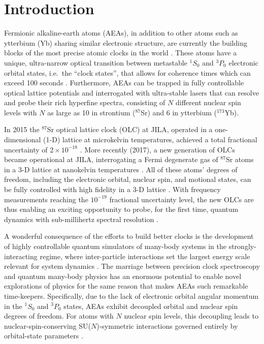 \documentclass[preprint,showkeys,nofootinbib]{revtex4-1}
\newcommand{\1}{\mathds{1}}
\begin{document}
\section{Introduction}
\label{sec:introduction}

Fermionic alkaline-earth atoms (AEAs), in addition to other atoms such
as ytterbium (Yb) sharing similar electronic structure, are currently
the building blocks of the most precise atomic clocks in the world
\cite{derevianko2011colloquium, katori2011optical, ludlow2015optical}.
These atoms have a unique, ultra-narrow optical transition between
metastable ${}^1S_0$ and ${}^3P_0$ electronic orbital states, i.e.~the
``clock states'', that allows for coherence times which can exceed 100
seconds \cite{porsev2004hyperfine, santra2004properties}.
Furthermore, AEAs can be trapped in fully controllable optical lattice
potentials and interrogated with ultra-stable lasers that can resolve
and probe their rich hyperfine spectra, consisting of $N$ different
nuclear spin levels with $N$ as large as 10 in strontium (${}^{87}$Sr)
and 6 in ytterbium (${}^{173}$Yb).

In 2015 the ${}^{87}$Sr optical lattice clock (OLC) at JILA, operated
in a one-dimensional (1-D) lattice at microkelvin temperatures,
achieved a total fractional uncertainty of $2\times10^{-18}$
\cite{bloom2014optical, nicholson2015systematic}.  More recently
(2017), a new generation of OLCs became operational at JILA,
interrogating a Fermi degenerate gas of ${}^{87}$Sr atoms in a 3-D
lattice at nanokelvin temperatures \cite{campbell2017fermidegenerate}.
All of these atoms' degrees of freedom, including the electronic
orbital, nuclear spin, and motional states, can be fully controlled
with high fidelity in a 3-D lattice \cite{daley2008quantum,
  gorshkov2009alkalineearthmetal, daley2011quantum,
  daley2011statedependent}.  With frequency measurements reaching the
$10^{-19}$ fractional uncertainty level, the new OLCs are thus
enabling an exciting opportunity to probe, for the first time, quantum
dynamics with sub-millihertz spectral resolution
\cite{campbell2017fermidegenerate}.

A wonderful consequence of the efforts to build better clocks is the
development of highly controllable quantum simulators of many-body
systems in the strongly-interacting regime, where inter-particle
interactions set the largest energy scale relevant for system dynamics
\cite{swallows2011suppression, lemke2011wave,
  campbell2017fermidegenerate}.  The marriage between precision clock
spectroscopy and quantum many-body physics \cite{taie2012su,
  martin2013quantum, scazza2014observation, cappellini2014direct,
  zhang2014spectroscopic, rey2014probing} has an enormous potential to
enable novel explorations of physics for the same reason that makes
AEAs such remarkable time-keepers.  Specifically, due to the lack of
electronic orbital angular momentum in the ${}^1S_0$ and ${}^3P_0$
states, AEAs exhibit decoupled orbital and nuclear spin degrees of
freedom.  For atoms with $N$ nuclear spin levels, this decoupling
leads to nuclear-spin-conserving SU($N$)-symmetric interactions
governed entirely by orbital-state parameters
\cite{cazalilla2009ultracold, taie2012su, zhang2014spectroscopic}.
\end{document}
